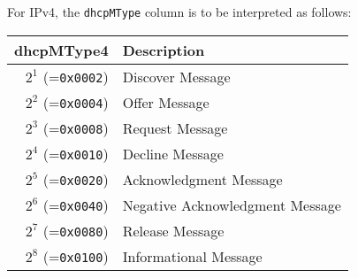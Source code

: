 \documentclass[documentation]{subfiles}
\begin{document}
For IPv4, the {\tt dhcpMType} column is to be interpreted as follows:
\begin{longtable}{rl}
    \toprule
    {\bf dhcpMType4} & {\bf Description}\\
    \midrule\endhead%
    $2^{1}$  (={\tt 0x0002}) & Discover Message\\
    $2^{2}$  (={\tt 0x0004}) & Offer Message\\
    $2^{3}$  (={\tt 0x0008}) & Request Message\\
    $2^{4}$  (={\tt 0x0010}) & Decline Message\\
    $2^{5}$  (={\tt 0x0020}) & Acknowledgment Message\\
    $2^{6}$  (={\tt 0x0040}) & Negative Acknowledgment Message\\
    $2^{7}$  (={\tt 0x0080}) & Release Message\\
    $2^{8}$  (={\tt 0x0100}) & Informational Message\\
    \bottomrule
\end{longtable}
\end{document}
